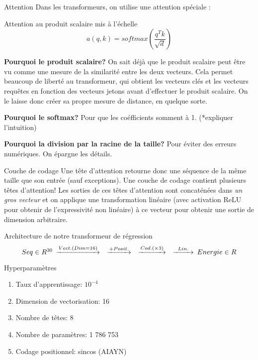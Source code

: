 \documentclass{beamer}
\begin{document}
\begin{frame}{Attention}
Dans les transformeurs, on utilise une attention spéciale :
\begin{block}{Attention au produit scalaire mis à l'échelle}
    \[ a(q, k) = softmax( \frac{q^Tk}{\sqrt{d}}) \]
\end{block}


{\bf Pourquoi le produit scalaire?}
On sait déjà que le produit scalaire peut être vu comme une mesure de la similarité entre
les deux vecteurs. Cela permet beaucoup de liberté au transformeur, qui obtient les vecteurs clés et les vecteurs requêtes en fonction des vecteurs jetons avant d'effectuer le produit scalaire. On le laisse donc créer sa propre mesure de distance, en quelque sorte.

\end{frame}

\begin{frame}{}
    
{\bf Pourquoi le softmax?}
Pour que les coéfficients somment à 1. (*expliquer l'intuition)

{\bf Pourquoi la division par la racine de la taille? }
Pour éviter des erreurs numériques. On épargne les détails.

\end{frame}

\begin{frame}{Couche de codage}
    Une tête d'attention retourne donc une séquence de la même taille que son entrée (sauf exceptions).
    Une couche de codage contient plusieurs têtes d'attention! Les sorties de ces 
    têtes d'attention sont concaténées dans {\it un gros vecteur} et on applique une transformation 
    linéaire (avec activation ReLU pour obtenir de l'expressivité non linéaire) à ce vecteur pour obtenir une sortie 
    de dimension arbitraire.
\end{frame}



\begin{frame}{Architecture de notre transformeur de régression}
\begin{equation*}
    \begin{CD}
        @. Seq \in R^{30}
        @>Vect. (Dim=16)>> 
        @>+Posit.>> 
        @>Cod. (\times 3)>> 
        @>Lin.>> Energie \in R
    \end{CD}
\end{equation*}

\begin{block}{Hyperparamètres}
\begin{enumerate}
    \item Taux d'apprentissage: $10^{-4}$
    \item Dimension de vectorisation: 16
    \item Nombre de têtes: 8
    \item Nombre de paramètres: 1 786 753 
    \item Codage positionnel: sincos (AIAYN)
\end{enumerate}
\end{block}
\end{frame}
\end{document}
